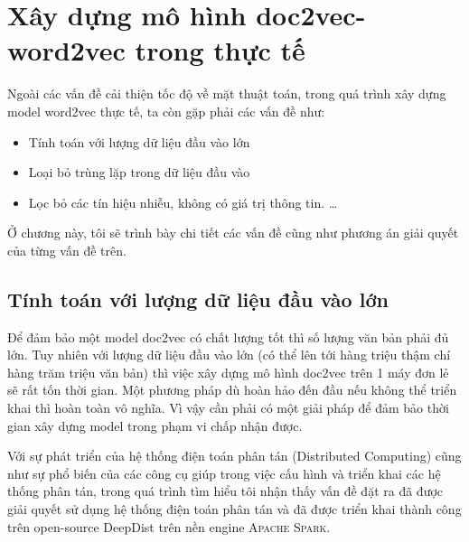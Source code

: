 
\chapter{Xây dựng mô hình doc2vec-word2vec trong thực tế}
\ifpdf
    \graphicspath{{Chuong1_hanhbd/Chapter1Figs/PNG/}{Chuong1_hanhbd/Chapter1Figs/PDF/}{Chuong1_hanhbd/Chapter1Figs/}}
\else
    \graphicspath{{Chuong1_hanhbd/Chapter1Figs/EPS/}{Chuong1_hanhbd/Chapter1Figs/}}
\fi

Ngoài các vấn đề cải thiện tốc độ về mặt thuật toán, trong quá trình xây dựng model word2vec  thực tế, ta còn gặp phải các vấn đề như:
\begin{itemize}  

        \item Tính toán với lượng dữ liệu đầu vào lớn

        \item Loại bỏ trùng lặp trong dữ liệu đầu vào

        \item Lọc bỏ các tín hiệu nhiễu, không có giá trị thông tin. \ldots 

    \end{itemize}
    
Ở chương này, tôi sẽ trình bày chi tiết các vấn đề cũng như phương án giải quyết của từng vấn đề trên.  
\section{Tính toán với lượng dữ liệu đầu vào lớn}  \label{DeepDist}

Để đảm bảo một model doc2vec có chất lượng tốt thì số lượng văn bản phải đủ lớn. Tuy nhiên với lượng dữ liệu đầu vào lớn (có thể lên tới hàng triệu thậm chí hàng trăm triệu văn bản) thì việc xây dựng mô hình doc2vec trên 1 máy đơn lẻ sẽ rất tốn thời gian. Một phương pháp dù hoàn hảo đến đầu nếu không thể triển khai thì hoàn toàn vô nghĩa. Vì vậy cần phải có một giải pháp để đảm bảo thời gian xây dựng model trong phạm vi chấp nhận được.

Với sự phát triển của hệ thống điện toán phân tán (Distributed Computing) cũng như sự phổ biến của các công cụ giúp trong việc cấu hình và triển khai các hệ thống phân tán, trong quá trình tìm hiểu tôi nhận thấy vấn đề đặt ra đã được giải quyết sử dụng hệ thống điện toán phân tán và đã được triển khai thành công trên open-source DeepDist \cite{DeepDist} trên nền engine \textsc{Apache Spark}. \cite{ApacheSpark}

